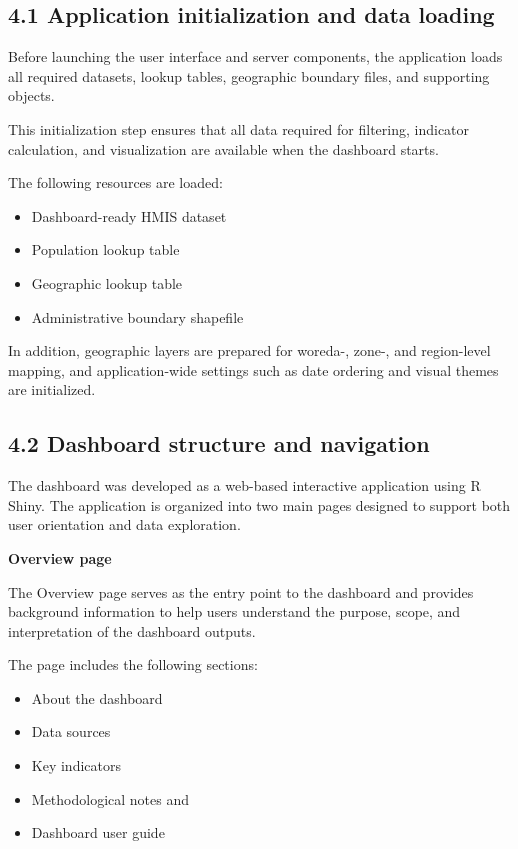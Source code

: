 \documentclass[
  letterpaper,
  DIV=11,
  numbers=noendperiod]{scrartcl}
\providecommand{\tightlist}{%
  \setlength{\itemsep}{0pt}\setlength{\parskip}{0pt}}
\begin{document}
\subsection{4.1 Application initialization and data
loading}\label{application-initialization-and-data-loading}

Before launching the user interface and server components, the
application loads all required datasets, lookup tables, geographic
boundary files, and supporting objects.

This initialization step ensures that all data required for filtering,
indicator calculation, and visualization are available when the
dashboard starts.

The following resources are loaded:

\begin{itemize}
\tightlist
\item
  Dashboard-ready HMIS dataset
\item
  Population lookup table
\item
  Geographic lookup table
\item
  Administrative boundary shapefile
\end{itemize}

In addition, geographic layers are prepared for woreda-, zone-, and
region-level mapping, and application-wide settings such as date
ordering and visual themes are initialized.

\subsection{4.2 Dashboard structure and
navigation}\label{dashboard-structure-and-navigation}

The dashboard was developed as a web-based interactive application using
R Shiny. The application is organized into two main pages designed to
support both user orientation and data exploration.

\textbf{Overview page}

The Overview page serves as the entry point to the dashboard and
provides background information to help users understand the purpose,
scope, and interpretation of the dashboard outputs.

The page includes the following sections:

\begin{itemize}
\tightlist
\item
  About the dashboard
\item
  Data sources
\item
  Key indicators
\item
  Methodological notes and
\item
  Dashboard user guide
\end{itemize}
\end{document}
